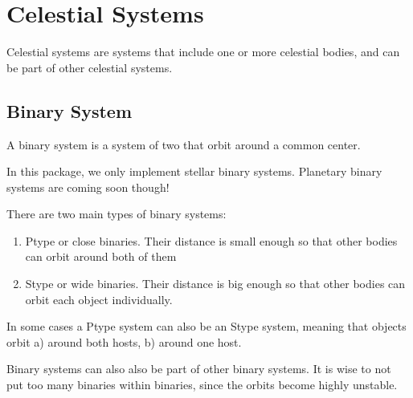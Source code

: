 \documentclass[letterpaper,10pt,english]{sphinxmanual}
\begin{document}
\chapter{Celestial Systems}
\label{\detokenize{celestial_systems/celestial_systems:celestial-systems}}\label{\detokenize{celestial_systems/celestial_systems::doc}}\label{\detokenize{celestial_systems/celestial_systems:id1}}
\sphinxAtStartPar
Celestial systems are systems that include one or more celestial bodies,
and can be part of other celestial systems.


\section{Binary System}
\label{\detokenize{celestial_systems/binary_system:binary-system}}\label{\detokenize{celestial_systems/binary_system::doc}}\label{\detokenize{celestial_systems/binary_system:id1}}
\sphinxAtStartPar
A binary system is a system of two {\hyperref[\detokenize{celestial_bodies/celestial_bodies:id1}]{}} that orbit around a common center.

\sphinxAtStartPar
In this package, we only implement stellar binary systems.
Planetary binary systems are coming soon though!

\sphinxAtStartPar
There are two main types of binary systems:
\begin{enumerate}
%
\item {} 
\sphinxAtStartPar
P\sphinxhyphen{}type or close binaries. Their distance is small enough so that other bodies can orbit around both of them

\item {} 
\sphinxAtStartPar
S\sphinxhyphen{}type or wide binaries. Their distance is big enough so that other bodies can orbit each object individually.

\end{enumerate}

\sphinxAtStartPar
In some cases a P\sphinxhyphen{}type system can also be an S\sphinxhyphen{}type system, meaning that objects orbit
a) around both hosts, b) around one host.

\sphinxAtStartPar
Binary systems can also also be part of other binary systems. It is wise
to not put too many binaries within binaries, since the orbits become highly unstable.
\end{document}
